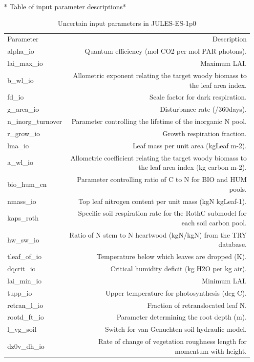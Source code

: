 \documentclass[gmd, manuscript]{copernicus}
\begin{document}
* Table of input parameter descriptions*
\begin{table}[t]
\caption{Uncertain input parameters in JULES-ES-1p0}
\label{table:Parameters}
\begin{tabular}{l r}
\tophline
Parameter & Description  \\ 
\middlehline

alpha\_io & Quantum efficiency (mol CO2 per mol PAR photons). \\ 
  lai\_max\_io & Maximum LAI. \\ 
  b\_wl\_io & Allometric exponent relating the target woody biomass to the leaf area index.\\ 
  fd\_io & Scale factor for dark respiration.\\ 
  g\_area\_io &  Disturbance rate (/360days).\\ 
  n\_inorg\_turnover &Parameter controlling the lifetime of the inorganic N pool. \\ 
  r\_grow\_io & Growth respiration fraction.\\ 
  lma\_io & Leaf mass per unit area (kgLeaf m-2). \\ 
  a\_wl\_io & Allometric coefficient relating the target woody biomass to the leaf area index (kg carbon m-2). \\ 
  bio\_hum\_cn &  Parameter controlling ratio of C to N for BIO and HUM pools.\\ 
  nmass\_io &  Top leaf nitrogen content per unit mass (kgN kgLeaf-1).\\ 
  kaps\_roth &  Specific soil respiration rate for the RothC submodel for each soil carbon pool.\\ 
  hw\_sw\_io & Ratio of N stem to N heartwood (kgN/kgN) from the TRY database. \\ 
  tleaf\_of\_io & Temperature below which leaves are dropped (K).\\ 
  dqcrit\_io & Critical humidity deficit (kg H2O per kg air). \\ 
  lai\_min\_io & Minimum LAI. \\ 
  tupp\_io & Upper temperature for photosynthesis (deg C). \\ 
  retran\_l\_io & Fraction of retranslocated leaf N.\\ 
  rootd\_ft\_io & Parameter determining the root depth (m). \\ 
  l\_vg\_soil & Switch for van Genuchten soil hydraulic model. \\ 
  dz0v\_dh\_io & Rate of change of vegetation roughness length for momentum with height. \\ 

\end{tabular}
\end{table}
\end{document}
